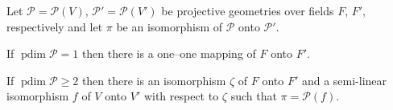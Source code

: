 Let $\mathcal{P} = \mathcal{P}(V)$, $\mathcal{P}' = \mathcal{P}(V')$ be projective geometries over fields $F$, $F'$, respectively and let $\pi$ be an isomorphism of $\mathcal{P}$ onto $\mathcal{P}'$.

If $\operatorname{pdim} \mathcal{P} = 1$ then there is a one--one mapping of $F$ onto $F'$.

If $\operatorname{pdim} \mathcal{P} \geq 2$ then there is an isomorphism $\zeta$ of $F$ onto $F'$ and a semi-linear isomorphism $f$ of $V$ onto $V'$ with respect to $\zeta$ such that $\pi = \mathcal{P}(f)$.
